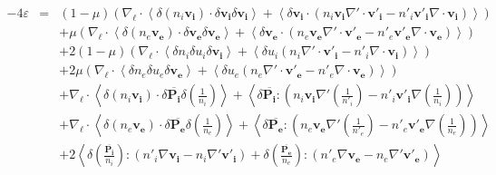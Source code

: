 \begin{equation} \boxed{\begin{array}{lcl}
  \label{eq:turb_bi_EL} - 4  \varepsilon &=& \left(1-\mu\right)\left( \nabla_{\boldsymbol{\ell}} \cdot\left<  \delta \left(n_i \boldsymbol{v_i}\right) \cdot \delta \boldsymbol{v_i}\delta \boldsymbol{v_i} \right> +\left<\delta \boldsymbol{v_i}\cdot \left(n_i \boldsymbol{v_i}   \nabla' \cdot \boldsymbol{v'_i}- n'_i \boldsymbol{v'_i} \nabla \cdot \boldsymbol{v_i}\right)\right>\right)  \\ %
 &&+ \mu\left( \nabla_{\boldsymbol{\ell}} \cdot\left<  \delta \left(n_e \boldsymbol{v_e}\right) \cdot \delta \boldsymbol{v_e}\delta \boldsymbol{v_e} \right> +\left<\delta \boldsymbol{v_e}\cdot \left(n_e \boldsymbol{v_e}   \nabla' \cdot \boldsymbol{v'_e}- n'_e \boldsymbol{v'_e} \nabla \cdot \boldsymbol{v_e}\right)\right>\right)  \\ %
  &&+ 2  \left(1-\mu\right) \left(\nabla_{\boldsymbol{\ell}} \cdot\left<  \delta n_i  \delta u_i\delta \boldsymbol{v_i} \right> +\left<\delta u_i  \left(n_i \nabla' \cdot \boldsymbol{v'_i}- n'_i \nabla \cdot \boldsymbol{v_i}\right)\right> \right) \\ %
  &&+ 2  \mu \left(\nabla_{\boldsymbol{\ell}} \cdot\left<  \delta n_e  \delta u_e\delta \boldsymbol{v_e} \right> +\left<\delta u_e  \left(n_e \nabla' \cdot \boldsymbol{v'_e}- n'_e \nabla \cdot \boldsymbol{v_e}\right)\right> \right) \\ %
  &&+ \nabla_{\boldsymbol{\ell}} \cdot\left<  \delta \left(n_i \boldsymbol{v_i}\right) \cdot \delta \overline{\boldsymbol{P_i}} \delta \left(\frac{1}{n_i}\right)\right> + \left<\delta \overline{\boldsymbol{P_i}} : \left(n_i \boldsymbol{v_i}  \nabla' \left(\frac{1}{n'_i}\right) - n'_i \boldsymbol{v'_i} \nabla \left(\frac{1}{n_i}\right)\right)\right>  \\ %
  &&+ \nabla_{\boldsymbol{\ell}} \cdot\left<  \delta \left(n_e \boldsymbol{v_e}\right) \cdot \delta \overline{\boldsymbol{P_e}} \delta \left(\frac{1}{n_e}\right)\right> + \left<\delta \overline{\boldsymbol{P_e}} : \left(n_e \boldsymbol{v_e}  \nabla' \left(\frac{1}{n'_e}\right) - n'_e \boldsymbol{v'_e} \nabla \left(\frac{1}{n_e}\right)\right)\right>  \\ %
  &&+ 2 \left<\delta \left(\frac{\overline{\boldsymbol{P_i}}}{n_i}\right) : \left(n'_i \nabla\boldsymbol{v_i} - n_i \nabla' \boldsymbol{v'_i}\right) +\delta \left(\frac{\overline{\boldsymbol{P_e}}}{n_e}\right) : \left(n'_e \nabla\boldsymbol{v_e} - n_e \nabla' \boldsymbol{v'_e}\right) \right>  \\ %

\end{array}}
\end{equation}
